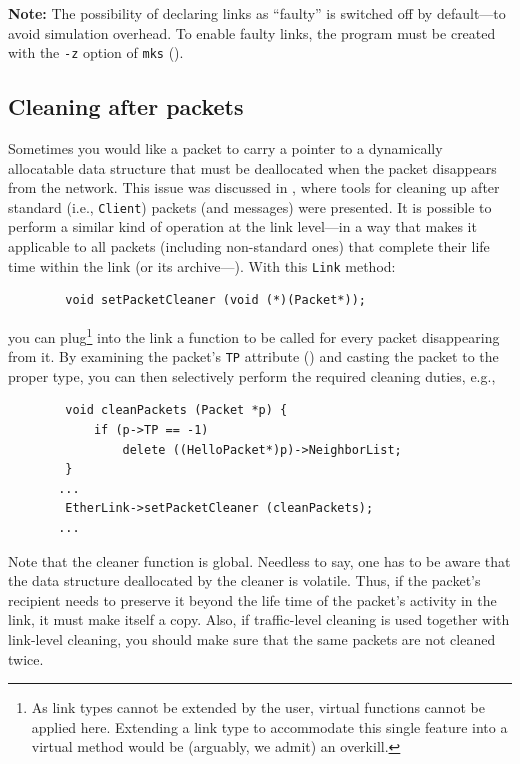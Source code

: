 \medskip

\noindent
{\bf Note:}
The possibility of declaring links as ``faulty'' is switched off by default---to
avoid simulation overhead.
To enable faulty links, the program must be created with the {\tt -z}
option of {\tt mks} ().

\subsection{Cleaning after packets}
\label{rm_po_cl}

Sometimes you would like a packet to carry a pointer to a dynamically
allocatable data structure that must be deallocated when the packet disappears
from the network.
This issue was discussed in , where tools for cleaning
up after standard (i.e., {\tt Client}) packets (and messages) were presented.
It is possible to perform a similar kind of operation at the link level---in a
way that makes it applicable to all packets (including non-standard ones) that
complete their life time within the link (or its archive---).
With this {\tt Link} method:
\begin{verbatim}
        void setPacketCleaner (void (*)(Packet*));
\end{verbatim}
\noindent
you can plug\footnote{As link types cannot be extended by the user, virtual
functions cannot be applied here.
Extending a link type to accommodate this single feature into a virtual method
would be (arguably, we admit) an overkill.}
into the link a function to be called for every packet
disappearing from it.
By examining the packet's {\tt TP} attribute ()
and casting the packet to the proper type,
you can then selectively perform the required cleaning duties, e.g.,
\begin{verbatim}
        void cleanPackets (Packet *p) {
            if (p->TP == -1)
                delete ((HelloPacket*)p)->NeighborList;
        }
       ...
        EtherLink->setPacketCleaner (cleanPackets);
       ...
\end{verbatim}
\noindent
Note that the cleaner function is global.
Needless to say, one has to be aware that the data structure deallocated by the
cleaner is volatile.
Thus, if the packet's recipient needs to preserve it beyond the life time of the
packet's activity in the link, it must make itself a copy.
Also, if traffic-level cleaning is used together with link-level cleaning,
you should make sure that the same packets are not cleaned twice.

